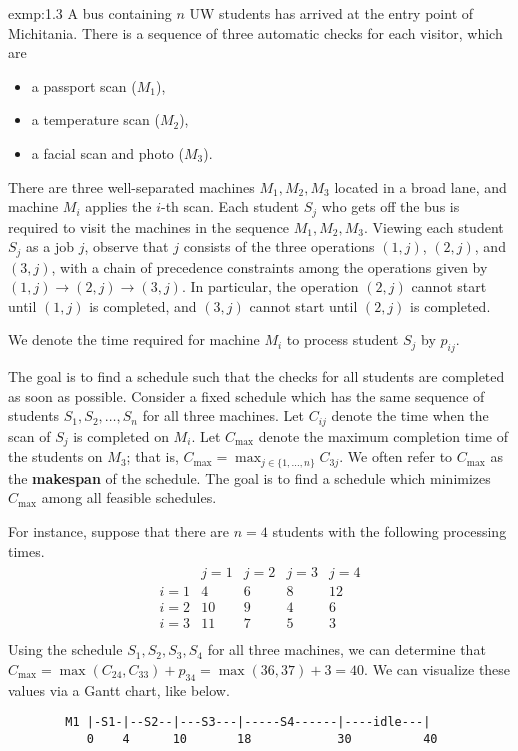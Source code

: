 \begin{exmp}{exmp:1.3}
    A bus containing $n$ UW students has arrived at the entry point of 
    Michitania. There is a sequence of three automatic checks for each 
    visitor, which are 
    \begin{itemize}
        \item a passport scan ($M_1$),
        \item a temperature scan ($M_2$), 
        \item a facial scan and photo ($M_3$).
    \end{itemize}
    There are three well-separated machines $M_1, M_2, M_3$ located in a 
    broad lane, and machine $M_i$ applies the $i$-th scan. Each student 
    $S_j$ who gets off the bus is required to visit the machines in the 
    sequence $M_1, M_2, M_3$. Viewing each student $S_j$ as a job $j$, 
    observe that $j$ consists of the three operations $(1, j)$, $(2, j)$, 
    and $(3, j)$, with a chain of precedence constraints among the 
    operations given by $(1, j) \to (2, j) \to (3, j)$. In particular, 
    the operation $(2, j)$ cannot start until $(1, j)$ is completed, 
    and $(3, j)$ cannot start until $(2, j)$ is completed. 

    We denote the time required for machine $M_i$ to process student 
    $S_j$ by $p_{ij}$. 

    The goal is to find a schedule such that the checks for all students 
    are completed as soon as possible. Consider a fixed schedule which 
    has the same sequence of students $S_1, S_2, \dots, S_n$ for all 
    three machines. Let $C_{ij}$ denote the time when the scan of $S_j$ 
    is completed on $M_i$. Let $C_{\max}$ denote the maximum completion 
    time of the students on $M_3$; that is, $C_{\max} = 
    \max_{j \in \{1, \dots, n\}} C_{3j}$. We often refer to 
    $C_{\max}$ as the {\bf makespan} of the schedule. The goal is to 
    find a schedule which minimizes $C_{\max}$ among all feasible schedules.
    
    For instance, suppose that there are $n = 4$ students with the 
    following processing times. 
    \begin{align*}
        \begin{array}{c|cccc}
            & j=1 & j=2 & j=3 & j=4 \\ \hline
        i=1 & 4   & 6   & 8   & 12  \\
        i=2 & 10  & 9   & 4   & 6   \\
        i=3 & 11  & 7   & 5   & 3   \\
        \end{array}
    \end{align*}
    Using the schedule $S_1, S_2, S_3, S_4$ for all three machines, we 
    can determine that $C_{\max} = \max(C_{24}, C_{33}) + p_{34} = 
    \max(36, 37) + 3 = 40$. We can visualize these values via a Gantt chart, 
    like below. 
    \begin{verbatim}
        M1 |-S1-|--S2--|---S3---|-----S4------|----idle---|
           0    4      10       18            30          40 


\end{verbatim}
\end{exmp}
